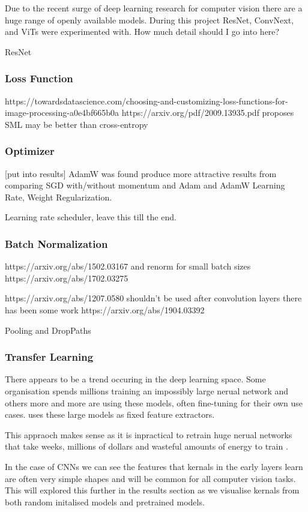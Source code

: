 Due to the recent surge of deep learning research for computer vision there are a huge range of openly available models.
During this project ResNet, ConvNext, and ViTs were experimented with.  How much detail should I go into here?

ResNet

\subsubsection{Loss Function}
https://towardsdatascience.com/choosing-and-customizing-loss-functions-for-image-processing-a0e4bf665b0a
https://arxiv.org/pdf/2009.13935.pdf proposes SML may be better than cross-entropy

\subsubsection{Optimizer}

[put into results]
AdamW was found produce more attractive results from comparing SGD with/without momentum and Adam and AdamW \cite{}
Learning Rate, Weight Regularization.

Learning rate scheduler, leave this till the end.

\subsubsection{Batch Normalization}
https://arxiv.org/abs/1502.03167 and renorm for small batch sizes https://arxiv.org/abs/1702.03275

https://arxiv.org/abs/1207.0580 shouldn't be used after convolution layers \cite{} there has been some work https://arxiv.org/abs/1904.03392

Pooling and DropPaths

\subsubsection{Transfer Learning}
There appears to be a trend occuring in the deep learning space.  Some organisation spends millions training an impossibly large nerual network
and others more and more are using these models, often fine-tuning for their own use cases.  \cite{} uses these large models as fixed feature extractors.

This appraoch makes sense as it is inpractical to retrain huge nerual networks that take weeks, millions of dollars and wasteful amounts of energy
to train \cite{}.

In the case of CNNs we can see the features that kernals in the early layers learn \cite{} are often very simple shapes and will be common for all
computer vision tasks.  This will explored this further in the results section as we visualise kernals from both random initalised models and 
pretrained models.

